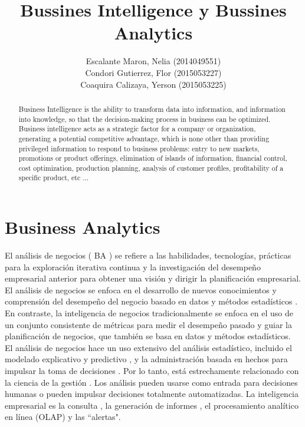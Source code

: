 \documentclass[preprint,12pt]{elsarticle}
\begin{document}
	
	\begin{frontmatter}
		
		
		\title{\huge Bussines Intelligence y Bussines Analytics}
		
		
		\author{Escalante Maron, Nelia (2014049551)  
			\\Condori Gutierrez, Flor (2015053227)
		\\Coaquira Calizaya, Yerson (2015053225)    }
		
		\address{Tacna, Peru}
		
		\begin{abstract}
			Business Intelligence is the ability to transform data into information, and information into knowledge, so that the decision-making process in business can be optimized.
			Business intelligence acts as a strategic factor for a company or organization, generating a potential competitive advantage, which is none other than providing privileged information to respond to business problems: entry to new markets, promotions or product offerings, elimination of islands of information, financial control, cost optimization, production planning, analysis of customer profiles, profitability of a specific product, etc ...
			
		\end{abstract}
		
	\end{frontmatter}
	
	
	\section{Business Analytics}
	\label{S:1}
	
	El análisis de negocios ( BA ) se refiere a las habilidades, tecnologías, prácticas para la exploración iterativa continua y la investigación del desempeño empresarial anterior para obtener una visión y dirigir la planificación empresarial. El análisis de negocios se enfoca en el desarrollo de nuevos conocimientos y comprensión del desempeño del negocio basado en datos y métodos estadísticos . En contraste, la inteligencia de negocios tradicionalmente se enfoca en el uso de un conjunto consistente de métricas para medir el desempeño pasado y guiar la planificación de negocios, que también se basa en datos y métodos estadísticos.\\
	
	El análisis de negocios hace un uso extensivo del análisis estadístico, incluido el modelado explicativo y predictivo , y la administración basada en hechos para impulsar la toma de decisiones . Por lo tanto, está estrechamente relacionado con la ciencia de la gestión . Los análisis pueden usarse como entrada para decisiones humanas o pueden impulsar decisiones totalmente automatizadas. La inteligencia empresarial es la consulta , la generación de informes , el procesamiento analítico en línea (OLAP) y las ``alertas". \\
	
\end{document}
